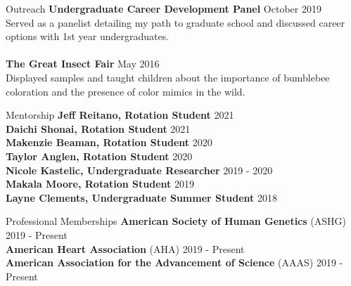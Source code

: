 \documentclass{resume} %
\begin{document}
\begin{rSection}{Outreach}
{\bf Undergraduate Career Development Panel} \hfill {October 2019}\\
Served as a panelist detailing my path to graduate school and discussed career options with 1st year undergraduates.\\\\
{\bf The Great Insect Fair} \hfill {May 2016}\\
Displayed samples and taught children about the importance of bumblebee coloration and the presence of color mimics in the wild.\\

\end{rSection}


\begin{rSection}{Mentorship}
{\bf Jeff Reitano, Rotation Student} \hfill {2021}\\
{\bf Daichi Shonai, Rotation Student} \hfill {2021}\\
{\bf Makenzie Beaman, Rotation Student} \hfill {2020}\\
{\bf Taylor Anglen, Rotation Student} \hfill {2020}\\
{\bf Nicole Kastelic, Undergraduate Researcher} \hfill {2019 - 2020}\\
{\bf Makala Moore, Rotation Student} \hfill {2019}\\
{\bf Layne Clements, Undergraduate Summer Student} \hfill {2018}\\

\end{rSection}


\begin{rSection}{Professional Memberships}
{\bf American Society of Human Genetics} (ASHG)  \hfill {2019 - Present} \\ 
{\bf American Heart Association} (AHA) \hfill {2019 - Present} \\ 
{\bf American Association for the Advancement of Science} (AAAS) \hfill {2019 - Present} \\
\end{rSection}
\end{document}
